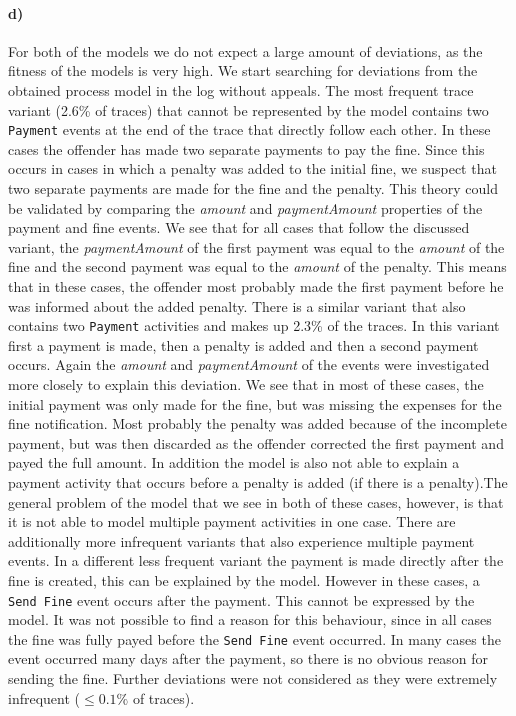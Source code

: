 \documentclass[12pt]{report}
\begin{document}
\paragraph{\textbf{d)}}

For both of the models we do not expect a large amount of deviations, as the fitness of the models is very high. We start searching for deviations from the obtained process model in the log without appeals. The most frequent trace variant (2.6\% of traces) that cannot be represented by the model contains two \texttt{Payment} events at the end of the trace that directly follow each other. In these cases the offender has made two separate payments to pay the fine. Since this occurs in cases in which a penalty was added to the initial fine, we suspect that two separate payments are made for the fine and the penalty. This theory could be validated by comparing the \emph{amount} and \emph{paymentAmount} properties of the payment and fine events. We see that for all cases that follow the discussed variant, the \emph{paymentAmount} of the first payment was equal to the \emph{amount} of the fine and the second payment was equal to the \emph{amount} of the penalty. This means that in these cases, the offender most probably made the first payment before he was informed about the added penalty. 
There is a similar variant that also contains two \texttt{Payment} activities and makes up 2.3\% of the traces. In this variant first a payment is made, then a penalty is added and then a second payment occurs. Again the \emph{amount} and \emph{paymentAmount} of the events were investigated more closely to explain this deviation. We see that in most of these cases, the initial payment was only made for the fine, but was missing the expenses for the fine notification. Most probably the penalty was added because of the incomplete payment, but was then discarded as the offender corrected the first payment and payed the full amount. In addition the model is also not able to explain a payment activity that occurs before a penalty is added (if there is a penalty).The general problem of the model that we see in both of these cases, however, is that it is not able to model multiple payment activities in one case. There are additionally more infrequent variants that also experience multiple payment events.
In a different less frequent variant the payment is made directly after the fine is created, this can be explained by the model. However in these cases, a \texttt{Send Fine} event occurs after the payment. This cannot be expressed by the model. It was not possible to find a reason for this behaviour, since in all cases the fine was fully payed before the \texttt{Send Fine} event occurred. In many cases the event occurred many days after the payment, so there is no obvious reason for sending the fine.
Further deviations were not considered as they were extremely infrequent ($\leq 0.1\%$ of traces).
\end{document}
